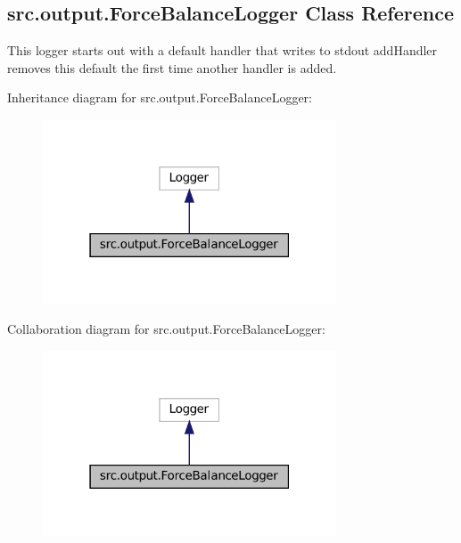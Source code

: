 \hypertarget{classsrc_1_1output_1_1ForceBalanceLogger}{}\subsection{src.\+output.\+Force\+Balance\+Logger Class Reference}
\label{classsrc_1_1output_1_1ForceBalanceLogger}


This logger starts out with a default handler that writes to stdout add\+Handler removes this default the first time another handler is added.  




Inheritance diagram for src.\+output.\+Force\+Balance\+Logger\+:
\nopagebreak
\begin{figure}[H]
\begin{center}
\leavevmode
\includegraphics[width=247pt]{classsrc_1_1output_1_1ForceBalanceLogger__inherit__graph}
\end{center}
\end{figure}


Collaboration diagram for src.\+output.\+Force\+Balance\+Logger\+:
\nopagebreak
\begin{figure}[H]
\begin{center}
\leavevmode
\includegraphics[width=247pt]{classsrc_1_1output_1_1ForceBalanceLogger__coll__graph}
\end{center}
\end{figure}
